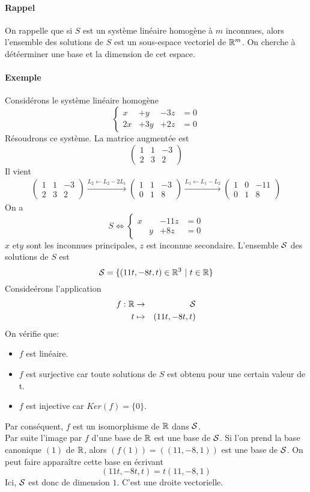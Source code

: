 \paragraph{Rappel} On rappelle que si $S$ est un système linéaire homogène à $m$ inconnues, alors l'ensemble des solutions de $S$ est un sous-espace vectoriel de $\mathbb{R}^m$. On cherche à détéerminer une base et la dimension de cet espace.

\paragraph{Exemple} Considérons le système linéaire homogène
$$\left\{\begin{array}{cccc}
   x & + y & -3z & = 0 \\
  2x & +3y & +2z & = 0
\end{array}\right. $$
Résoudrons ce système. La matrice augmentée est
$$\begin{pmatrix}
 1 & 1 & -3 \\
 2 & 3 & 2
\end{pmatrix}$$
Il vient
\begin{eqnarray*}
  \begin{pmatrix} 
    1 & 1 &-3 \\ 
    2 &3 & 2
  \end{pmatrix} 
  \xrightarrow{L_2 \leftarrow L_2 - 2L_1}
  \begin{pmatrix}
    1 & 1 &-3 \\ 
    0 & 1 & 8
  \end{pmatrix} 
  \xrightarrow{L_1 \leftarrow L_1 - L_2}
  \begin{pmatrix} 
    1 & 0 & -11 \\ 
    0 & 1 & 8
  \end{pmatrix}
\end{eqnarray*}
On a 
$$S \Leftrightarrow \left\{\begin{array}{cccc} x & & -11 z & = 0 \\ & y & +8 z & = 0 \end{array} \right.$$
$x$ et$y$ sont les inconnues principales, $z$ est inconnue secondaire. L'ensemble $\mathcal{S}$ des solutions de $S$ est 
$$\mathcal{S} = \{(11t, -8t, t) \in \mathbb{R}^3 ~ \vert ~ t \in \mathbb{R} \}$$
Consideérons l'application
\begin{eqnarray*}
  f: \mathbb{R} &\rightarrow& \mathcal{S} \\
  t &\mapsto & (11t, -8t, t)
\end{eqnarray*}
On vérifie que:
\begin{itemize}
  \item $f$ est linéaire.
  \item $f$ est surjective car toute solutions de $S$ est obtenu pour une certain valeur de t.
  \item $f$ est injective car $Ker(f) = \{0\}$.
\end{itemize}
Par conséquent, $f$ est un isomorphisme de $\mathbb{R}$ dans $\mathcal{S}$. \\
Par suite l'image par $f$ d'une base de $\mathbb{R}$ est une base de $\mathcal{S}$. Si l'on prend la base canonique $(1)$ de $\mathbb{R}$, alors $(f(1)) = ((11, -8, 1))$ est une base de $\mathcal{S}$. On peut faire apparaître cette base en écrivant 
$$(11t, -8t, t) = t (11, -8, 1)$$
Ici, $\mathcal{S}$ est donc de dimension $1$. C'est une droite vectorielle.

